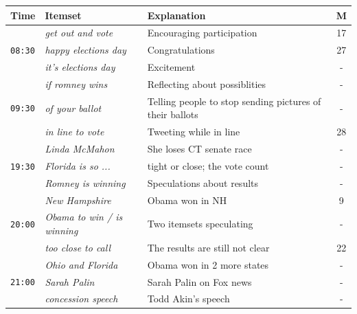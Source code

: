 \documentclass{sig-alternate}
\begin{document}
\begin{table}
\begin{center}
\footnotesize
\def\arraystretch{1.2}
\begin{tabular}{|p{0.7cm}|p{2.5cm}|p{4cm}|c|}
\hline
\textbf{Time} & \textbf{Itemset} & \textbf{Explanation} & \textbf{M} \\ \hline
\multirow{3}{*}{\texttt{08:30}}
& \em get out and vote & Encouraging participation & 17 \\ \cline{2-4}
& \em \scriptsize happy elections day & Congratulations & 27 \\ \cline{2 - 4}
& \em it's elections day & Excitement  & - \\ \hline

\multirow{3}{*}{\texttt{09:30}}
& \em if romney wins & Reflecting about possiblities & - \\ \cline{2 - 4} 
& \em of your ballot & Telling people to stop sending pictures of their ballots & - \\ \cline{2-4}
& \em in line to vote & Tweeting while in line  & 28 \\ \hline


\multirow{3}{*}{\texttt{19:30}}
& \em Linda  McMahon		&  She loses CT senate race & - \\ \cline{2 - 4}
& \em Florida is so ... & tight or close; the vote count  & - \\ \cline{2-4}
& \em \small Romney is winning & Speculations about results  & - \\ \hline 


\multirow{3}{*}{\texttt{20:00}}
& \em New Hampshire &  Obama won in NH & 9 \\ \cline{2 - 4}
& \em Obama to win / is winning & Two itemsets speculating  & - \\ \cline{2-4}
& \em too close to call & The results are still not clear & 22 \\ \hline


\multirow{3}{*}{\texttt{21:00}}
& \em Ohio and Florida &  Obama won in 2 more states & - \\ \cline{2 - 4}
& \em Sarah Palin & Sarah Palin  on Fox news  & - \\ \cline{2-4} 
& \em concession speech & Todd Akin's  speech & - \\ \hline



\end{tabular}
\end{center}
\end{table}
\end{document}
